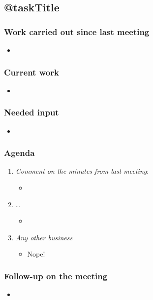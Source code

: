 \subsection{@taskTitle}
\label{task:@label}
\subsubsection{Work carried out since last meeting}
\begin{itemize}
    \item
\end{itemize}

\subsubsection{Current work}
\begin{itemize}
    \item 
\end{itemize}

\subsubsection{Needed input}
\begin{itemize}
    \item 
\end{itemize}

\subsubsection{Agenda}
\begin{enumerate}
    \item \textit{Comment on the minutes from last meeting}:
    \begin{itemize}
        \item
    \end{itemize}
    
    \item \ldots
    \begin{itemize}
        \item
    \end{itemize}
    \item \textit{Any other business}
    \begin{itemize}
        \item Nope!
    \end{itemize}
\end{enumerate}

\subsubsection{Follow-up on the meeting}
\begin{itemize}
    \item 
\end{itemize}
